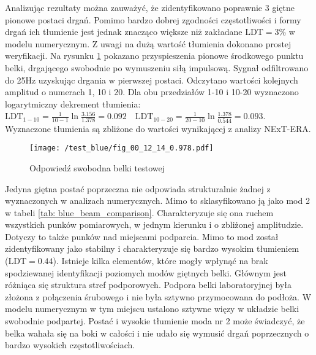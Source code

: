 Analizując rezultaty można zauważyć, że zidentyfikowano poprawnie 3 giętne pionowe postaci drgań. Pomimo bardzo dobrej zgodności częstotliwości i formy drgań ich tłumienie jest jednak znacząco większe niż zakładane LDT$=3\%$ w modelu numerycznym. Z uwagi na dużą wartość tłumienia dokonano prostej weryfikacji. Na rysunku \ref{fig: blue_beam_natural_vib} pokazano przyspieszenia pionowe środkowego punktu belki, drgającego swobodnie po wymuszeniu siłą impulsową. 
Sygnał odfiltrowano do 25Hz uzyskując drgania w pierwszej postaci. Odczytano wartości kolejnych amplitud o numerach 1, 10 i 20. Dla obu przedziałów 1-10 i 10-20 wyznaczono logarytmiczny dekrement tłumienia: $\textrm{LDT}_{1-10} = \frac{1}{10-1} \ln{\frac{3.156}{1.378}}=0.092 \quad
\textrm{LDT}_{10-20}=\frac{1}{20-10}\ln{\frac{1.378}{0.544}}=0.093$. Wyznaczone tłumienia są zbliżone do wartości wynikającej z analizy NExT-ERA.


\begin{figure}[hbt!]
	\centering
	\texttt{[image: /test\_blue/fig\_00\_12\_14\_0.978.pdf]}
	\captionsetup{justification=centering}
	\caption{Odpowiedź swobodna belki testowej}
	\label{fig: blue_beam_natural_vib}
\end{figure}


 Jedyna giętna postać poprzeczna nie odpowiada strukturalnie żadnej z wyznaczonych w analizach numerycznych. Mimo to sklasyfikowano ją jako mod 2 w tabeli \ref{tab: blue_beam_comparison}. Charakteryzuje się ona ruchem wszystkich punków pomiarowych, w jednym kierunku i o zbliżonej amplitudzie. Dotyczy to także punków nad miejscami podparcia. Mimo to mod został zidentyfikowany jako stabilny i charakteryzuje się bardzo wysokim tłumieniem (LDT$=0.44$). Istnieje kilka elementów, które mogły wpłynąć na brak spodziewanej identyfikacji poziomych modów giętnych belki. Głównym jest różniąca się struktura stref podporowych. Podpora belki laboratoryjnej była złożona z połączenia śrubowego i nie była sztywno przymocowana do podłoża. W modelu numerycznym w tym miejscu ustalono sztywne więzy w układzie belki swobodnie podpartej. Postać i wysokie tłumienie moda nr 2 może świadczyć, że belka wahała się na boki w całości i nie udało się wymusić drgań poprzecznych o bardzo wysokich częstotliwościach.

